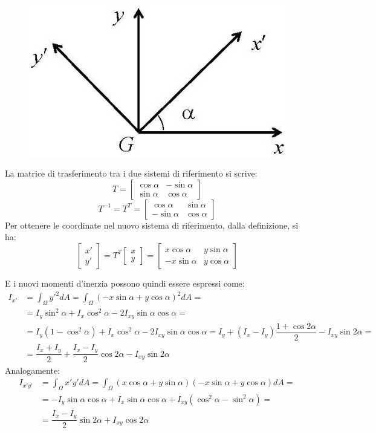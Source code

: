 \documentclass{article}
\begin{document}
\begin{adjustwidth}{2in}{}
\begin{figure}[H]
	\centering
	\includegraphics[width=0.25\linewidth]{immagini/1.PARTE7_Pagina_74}
\end{figure}
	La matrice di trasferimento tra i due sistemi di
	riferimento si scrive:
	\[
	T = \left[ \begin{array}{cc}
		\cos\alpha & -\sin\alpha \\
		\sin\alpha & \cos\alpha 
	\end{array}\right] 
	\]
	\[
	T^{-1} = T^T = \left[ \begin{array}{cc}
		\cos\alpha & \sin\alpha \\
		-\sin\alpha & \cos\alpha 
	\end{array}\right] \]
	Per ottenere le coordinate nel nuovo sistema di riferimento, dalla definizione, si ha:
	\[ \left[\begin{array}{c}
	x' \\
	y'
	\end{array} \right] = T^T \left[\begin{array}{c}
	x \\
	y
	\end{array} \right] = \left[ \begin{array}{cc}
	x\cos\alpha & y\sin\alpha \\
	-x\sin\alpha & y\cos\alpha 
	\end{array}\right]
	\]
	
	E i nuovi momenti d'inerzia possono quindi essere espressi come: 
	\[
	\begin{split}
		I_{x'} & = \int_{\Omega} y'^2 dA = \int_{\Omega}(-x\sin\alpha + y\cos\alpha)^2dA = \\
			   & = I_y \sin^2\alpha +I_x \cos^2\alpha - 2I_{xy}\sin\alpha\cos\alpha = \\
			   & = I_y (1-\cos^2\alpha) +I_x \cos^2\alpha - 2I_{xy}\sin\alpha\cos\alpha = I_y + (I_x - I_y)\dfrac{1+\cos2\alpha}{2}-I_{xy}\sin2\alpha = \\
			   & = \dfrac{I_x + I_y}{2} + \dfrac{I_x - I_y}{2} \cos2\alpha -I_{xy}\sin2\alpha 
	\end{split}
	\]
	Analogamente:
	\[
	\begin{split}
		I_{x'y'} & = \int_{\Omega} x'y' dA = \int_{\Omega}(x\cos\alpha + y\sin\alpha)(-x\sin\alpha + y\cos\alpha)dA = \\
		& = -I_y \sin\alpha\cos\alpha +I_x \sin\alpha\cos\alpha + I_{xy}(\cos^2\alpha - \sin^2\alpha) = \\
		& = \dfrac{I_x - I_y}{2}\sin2\alpha + I_{xy}\cos2\alpha  \\
	\end{split}
	\]
	

\end{adjustwidth}
\end{document}
